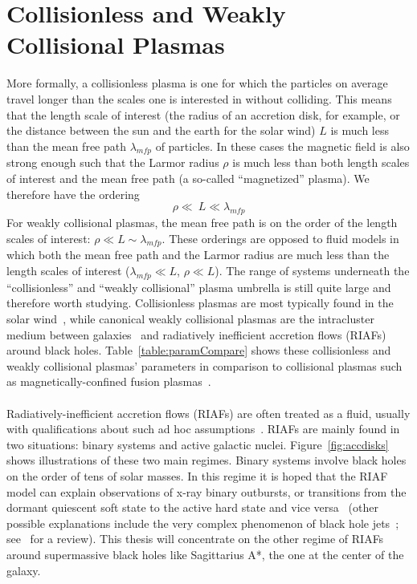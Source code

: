 \section{Collisionless and Weakly Collisional Plasmas}
More formally, a collisionless plasma is one for which the particles on average travel longer than the scales one is interested in without colliding. This means that the length scale of interest (the radius of an accretion disk, for example, or the distance between the sun and the earth for the solar wind) $L$ is much less than the mean free path $\lambda_{mfp}$ of particles. In these cases the magnetic field is also strong enough such that the Larmor radius $\rho$ is much less than both length scales of interest and the mean free path (a so-called ``magnetized'' plasma). We therefore have the ordering
\begin{equation}\label{eq:collLessOrdering}
  \rho\ll\ L \ll \lambda_{mfp}
\end{equation}
For weakly collisional plasmas, the mean free path is on the order of the length scales of interest: $\rho\ll L\sim\lambda_{mfp}$. These orderings are opposed to fluid models in which both the mean free path and the Larmor radius are much less than the length scales of interest ($\lambda_{mfp}\ll L$, $\rho\ll L$). The range of systems underneath the ``collisionless'' and ``weakly collisional'' plasma umbrella is still quite large and therefore worth studying. Collisionless plasmas are most typically found in the solar wind~\cite{Goldstein1995,Pilipp1987,Pudovkin1985}, while canonical weakly collisional plasmas are the intracluster medium between galaxies~\cite{Fabian1994,Carilli2002,Mendygral2012} and radiatively inefficient accretion flows (RIAFs) around black holes. Table~\ref{table:paramCompare} shows these collisionless and weakly collisional plasmas' parameters in comparison to collisional plasmas such as magnetically-confined fusion plasmas~\cite{Kunz2010}.\\
\\
Radiatively-inefficient accretion flows (RIAFs) are often treated as a fluid, usually with qualifications about such ad hoc assumptions~\cite{Dexter2013,Hawley2001,Stone1996,Jiang2013,Jiang2014,Stone1994,Turner2002,Sano2004}. RIAFs are mainly found in two situations: binary systems and active galactic nuclei. Figure~\ref{fig:accdisks} shows illustrations of these two main regimes. Binary systems involve black holes on the order of tens of solar masses. In this regime it is hoped that the RIAF model can explain observations of x-ray binary outbursts, or transitions from the dormant quiescent soft state to the active hard state and vice versa~\cite{McClintock2006,Das2013,Das2013b,Niedzwiecki2014,Sadowski2016} (other possible explanations include the very complex phenomenon of black hole jets~\cite{Veledina2013,Fender2009,Nixon2014}; see~\cite{Hawley2015} for a review). This thesis will concentrate on the other regime of RIAFs around supermassive black holes like Sagittarius A*, the one at the center of the galaxy.\\
